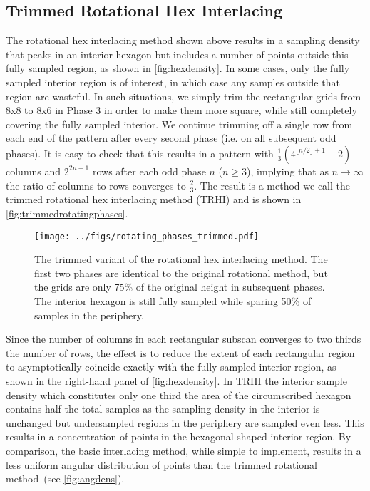 \documentclass[aip, amsmath, amssymb, nobibnotes, nofootinbib, citeautoscript, reprint, superscriptaddress]{revtex4-1}
\begin{document}
    \subsection{\label{ssec:trimmed}Trimmed Rotational Hex Interlacing}

    The rotational hex interlacing method shown above results in a sampling density that peaks in an interior hexagon but includes a number of points outside this fully sampled region, as shown in \autoref{fig:hexdensity}.
    In some cases, only the fully sampled interior region is of interest, in which case any samples outside that region are wasteful.
    In such situations, we simply trim the rectangular grids from 8x8 to 8x6 in
    Phase 3 in order to make them more square, while still completely covering the
    fully sampled interior.
    We continue trimming off a single row from each end of the pattern after
    every second phase (i.e. on all subsequent odd phases).
    It is easy to check that this results in a pattern with
    $\frac{1}{3}\left(4^{\lfloor n/2\rfloor + 1} + 2\right)$ columns and $2^{2n -
    1}$ rows after each odd phase $n$ ($n\ge 3$), implying that as $n\to\infty$ the
    ratio of columns to rows converges to $\frac{2}{3}$.
    The result is a method we call the trimmed rotational hex interlacing method
    (TRHI) and is shown in \autoref{fig:trimmedrotatingphases}.


    \begin{figure*}
        \centering
        \texttt{[image: ../figs/rotating\_phases\_trimmed.pdf]}
        \caption{
        \label{fig:trimmedrotatingphases} 
        The trimmed variant of the rotational hex interlacing method.
        The first two phases are identical to the original rotational method, but the grids are only 75\% of the original height in subsequent phases.
        The interior hexagon is still fully sampled while sparing 50\% of samples in the periphery.
        }
    \end{figure*}


    Since the number of columns in each rectangular subscan converges to two thirds
    the number of rows, the effect is to reduce the extent of each rectangular
    region to asymptotically coincide exactly with the fully-sampled interior
    region, as shown in the right-hand panel of \autoref{fig:hexdensity}.
    In TRHI the interior sample density which constitutes only one third the area of the circumscribed hexagon contains half the total samples as the sampling density in the interior is unchanged but undersampled regions in the periphery are sampled even less.
    This results in a concentration of points in the hexagonal-shaped interior region.
    By comparison, the basic interlacing method, while simple to implement, results in a less uniform angular distribution of points than the trimmed rotational method~(see \autoref{fig:angdens}).
\end{document}
